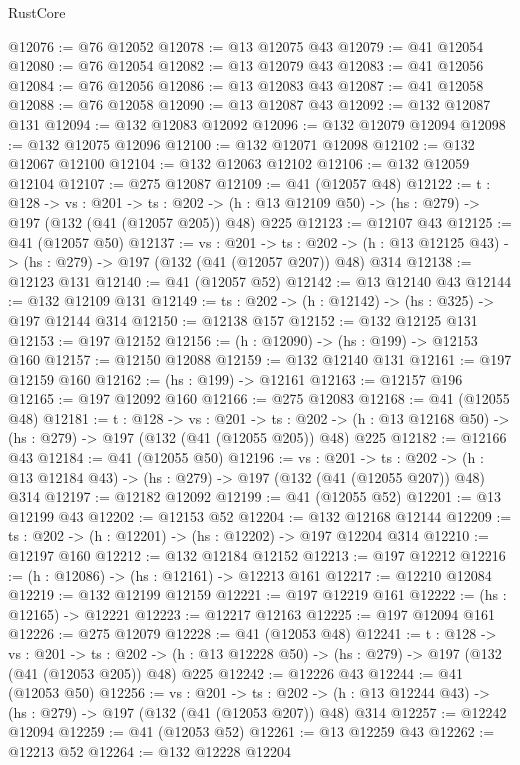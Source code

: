 \begin{lexlean}{RustCore}
\begin{coremodule}
@12076 := @76 @12052
@12078 := @13 @12075 @43
@12079 := @41 @12054
@12080 := @76 @12054
@12082 := @13 @12079 @43
@12083 := @41 @12056
@12084 := @76 @12056
@12086 := @13 @12083 @43
@12087 := @41 @12058
@12088 := @76 @12058
@12090 := @13 @12087 @43
@12092 := @132 @12087 @131
@12094 := @132 @12083 @12092
@12096 := @132 @12079 @12094
@12098 := @132 @12075 @12096
@12100 := @132 @12071 @12098
@12102 := @132 @12067 @12100
@12104 := @132 @12063 @12102
@12106 := @132 @12059 @12104
@12107 := @275 @12087
@12109 := @41 (@12057 @48)
@12122 := {t : @128} ->
  {vs : @201} ->
  {ts : @202} -> (h : @13 @12109 @50) -> (hs : @279) -> @197 (@132 (@41 (@12057 @205)) @48) @225
@12123 := @12107 @43
@12125 := @41 (@12057 @50)
@12137 := {vs : @201} ->
  {ts : @202} -> (h : @13 @12125 @43) -> (hs : @279) -> @197 (@132 (@41 (@12057 @207)) @48) @314
@12138 := @12123 @131
@12140 := @41 (@12057 @52)
@12142 := @13 @12140 @43
@12144 := @132 @12109 @131
@12149 := {ts : @202} -> (h : @12142) -> (hs : @325) -> @197 @12144 @314
@12150 := @12138 @157
@12152 := @132 @12125 @131
@12153 := @197 @12152
@12156 := (h : @12090) -> (hs : @199) -> @12153 @160
@12157 := @12150 @12088
@12159 := @132 @12140 @131
@12161 := @197 @12159 @160
@12162 := (hs : @199) -> @12161
@12163 := @12157 @196
@12165 := @197 @12092 @160
@12166 := @275 @12083
@12168 := @41 (@12055 @48)
@12181 := {t : @128} ->
  {vs : @201} ->
  {ts : @202} -> (h : @13 @12168 @50) -> (hs : @279) -> @197 (@132 (@41 (@12055 @205)) @48) @225
@12182 := @12166 @43
@12184 := @41 (@12055 @50)
@12196 := {vs : @201} ->
  {ts : @202} -> (h : @13 @12184 @43) -> (hs : @279) -> @197 (@132 (@41 (@12055 @207)) @48) @314
@12197 := @12182 @12092
@12199 := @41 (@12055 @52)
@12201 := @13 @12199 @43
@12202 := @12153 @52
@12204 := @132 @12168 @12144
@12209 := {ts : @202} -> (h : @12201) -> (hs : @12202) -> @197 @12204 @314
@12210 := @12197 @160
@12212 := @132 @12184 @12152
@12213 := @197 @12212
@12216 := (h : @12086) -> (hs : @12161) -> @12213 @161
@12217 := @12210 @12084
@12219 := @132 @12199 @12159
@12221 := @197 @12219 @161
@12222 := (hs : @12165) -> @12221
@12223 := @12217 @12163
@12225 := @197 @12094 @161
@12226 := @275 @12079
@12228 := @41 (@12053 @48)
@12241 := {t : @128} ->
  {vs : @201} ->
  {ts : @202} -> (h : @13 @12228 @50) -> (hs : @279) -> @197 (@132 (@41 (@12053 @205)) @48) @225
@12242 := @12226 @43
@12244 := @41 (@12053 @50)
@12256 := {vs : @201} ->
  {ts : @202} -> (h : @13 @12244 @43) -> (hs : @279) -> @197 (@132 (@41 (@12053 @207)) @48) @314
@12257 := @12242 @12094
@12259 := @41 (@12053 @52)
@12261 := @13 @12259 @43
@12262 := @12213 @52
@12264 := @132 @12228 @12204

\end{coremodule}
\end{lexlean}
